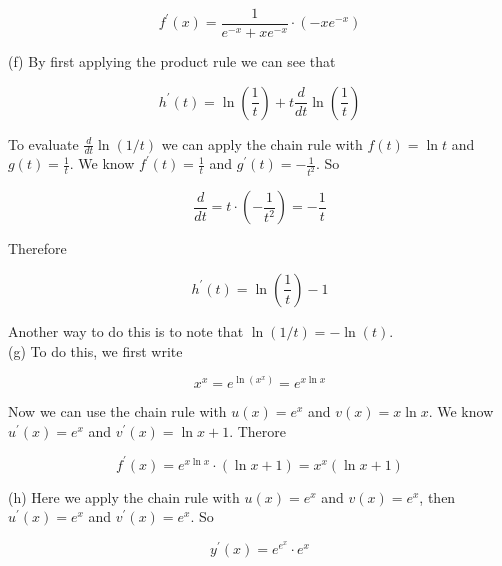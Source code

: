 \documentclass[10pt]{article}
\begin{document}
$$
f^{\prime}(x)=\frac{1}{e^{-x}+x e^{-x}} \cdot\left(-x e^{-x}\right)
$$

(f) By first applying the product rule we can see that

$$
h^{\prime}(t)=\ln \left(\frac{1}{t}\right)+t \frac{d}{d t} \ln \left(\frac{1}{t}\right)
$$

To evaluate $\frac{d}{d t} \ln (1 / t)$ we can apply the chain rule with $f(t)=\ln t$ and $g(t)=\frac{1}{t}$. We know $f^{\prime}(t)=\frac{1}{t}$ and $g^{\prime}(t)=-\frac{1}{t^{2}}$. So

$$
\frac{d}{d t}=t \cdot\left(-\frac{1}{t^{2}}\right)=-\frac{1}{t}
$$

Therefore

$$
h^{\prime}(t)=\ln \left(\frac{1}{t}\right)-1
$$

Another way to do this is to note that $\ln (1 / t)=-\ln (t)$.\\
(g) To do this, we first write

$$
x^{x}=e^{\ln \left(x^{x}\right)}=e^{x \ln x}
$$

Now we can use the chain rule with $u(x)=e^{x}$ and $v(x)=x \ln x$. We know $u^{\prime}(x)=e^{x}$ and $v^{\prime}(x)=\ln x+1$. Therore

$$
f^{\prime}(x)=e^{x \ln x} \cdot(\ln x+1)=x^{x}(\ln x+1)
$$

(h) Here we apply the chain rule with $u(x)=e^{x}$ and $v(x)=e^{x}$, then $u^{\prime}(x)=e^{x}$ and $v^{\prime}(x)=e^{x}$. So

$$
y^{\prime}(x)=e^{e^{x}} \cdot e^{x}
$$
\end{document}

